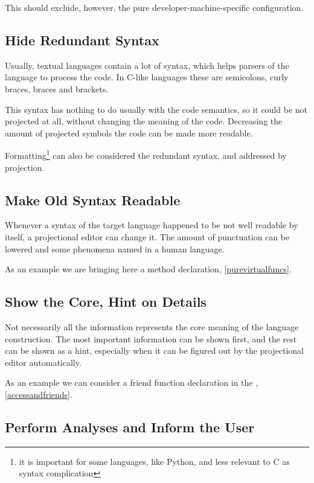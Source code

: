  This should exclude, however, the pure developer-machine-specific configuration.

\subsection{Hide Redundant Syntax}

 Usually, textual languages contain a lot of syntax, which helps parsers of the language to process the code. 
 In C-like languages these are semicolons, curly braces, braces and brackets.
 
 This syntax has nothing to do usually with the code semantics, so it could be not projected at all, without changing
 the meaning of the code. Decreasing the amount of projected symbols the code can be made more readable.
 
 Formatting\footnote{it is important for some languages, like Python, and less relevant to C as syntax complication} can also be considered the redundant syntax, and addressed by projection.

\subsection{Make Old Syntax Readable}

  Whenever a syntax of the target language happened to be not well readable by itself, a projectional editor can 
  change it. The amount of punctuation can be lowered and some phenomena named in a human language.
  
  As an example we are bringing here a  method declaration, \ref{purevirtualfuncs}.

\subsection{Show the Core, Hint on Details}

  Not necessarily all the information represents the core meaning of the language construction. The 
  most important information can be shown first, and the rest can be shown as a hint, especially when
  it can be figured out by the projectional editor automatically.
  
  As an example we can consider a friend function declaration in the \pcpp, \ref{accessandfriends}.

\subsection{Perform Analyses and Inform the User}
\label{analysisprinciple}

